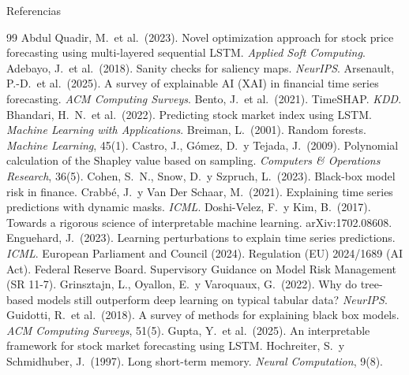 \documentclass{beamer}
\begin{document}
\begin{frame}[allowframebreaks]{Referencias}
    \tiny
    \begin{thebibliography}{99}
         Abdul Quadir, M.\ et al.\ (2023). Novel optimization
        approach for stock price forecasting using multi-layered
        sequential LSTM. \emph{Applied Soft Computing}.
         Adebayo, J.\ et al.\ (2018). Sanity checks for saliency
        maps. \emph{NeurIPS}.
         Arsenault, P.-D.\ et al.\ (2025). A survey of
        explainable AI (XAI) in financial time series forecasting.
        \emph{ACM Computing Surveys}.
         Bento, J.\ et al.\ (2021). TimeSHAP. \emph{KDD}.
         Bhandari, H.\ N.\ et al.\ (2022). Predicting stock
        market index using LSTM. \emph{Machine Learning with Applications}.
         Breiman, L.\ (2001). Random forests. \emph{Machine
        Learning}, 45(1).
         Castro, J., Gómez, D.\ y Tejada, J.\ (2009).
        Polynomial calculation of the Shapley value based on sampling.
        \emph{Computers \& Operations Research}, 36(5).
         Cohen, S.\ N., Snow, D.\ y Szpruch, L.\ (2023).
        Black-box model risk in finance.
         Crabbé, J.\ y Van Der Schaar, M.\ (2021). Explaining
        time series predictions with dynamic masks. \emph{ICML}.
         Doshi-Velez, F.\ y Kim, B.\ (2017). Towards a rigorous
        science of interpretable machine learning. arXiv:1702.08608.
         Enguehard, J.\ (2023). Learning perturbations to
        explain time series predictions. \emph{ICML}.
         European Parliament and Council (2024). Regulation (EU)
        2024/1689 (AI Act).
         Federal Reserve Board. Supervisory Guidance on Model
        Risk Management (SR 11-7).
         Grinsztajn, L., Oyallon, E.\ y Varoquaux, G.\ (2022).
        Why do tree-based models still outperform deep learning on
        typical tabular data? \emph{NeurIPS}.
         Guidotti, R.\ et al.\ (2018). A survey of methods for
        explaining black box models. \emph{ACM Computing Surveys}, 51(5).
         Gupta, Y.\ et al.\ (2025). An interpretable framework
        for stock market forecasting using LSTM.
         Hochreiter, S.\ y Schmidhuber, J.\ (1997). Long
        short-term memory. \emph{Neural Computation}, 9(8).

\end{thebibliography}
\end{frame}
\end{document}
